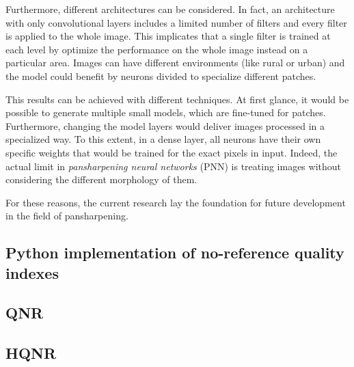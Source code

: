 \documentclass[12pt]{report}
\begin{document}
Furthermore, different architectures can be considered.
In fact, an architecture with only convolutional layers includes a limited number of filters and every filter is applied to the whole image.
This implicates that a single filter is trained at each level by optimize the performance on the whole image instead on a particular area.
Images can have different environments (like rural or urban) and the model could benefit by neurons divided to specialize different patches.

This results can be achieved with different techniques.
At first glance, it would be possible to generate multiple small models, which are fine-tuned for patches.
Furthermore, changing the model layers would deliver images processed in a specialized way.
To this extent, in a dense layer, all neurons have their own specific weights that would be trained for the exact pixels in input.
Indeed, the actual limit in \textit{pansharpening neural networks} (PNN) is treating images without considering the different morphology of them.

For these reasons, the current research lay the foundation for future development in the field of pansharpening.

\newpage




\newpage



\appendix

\begin{spacing}{1}
    \chapter{Python implementation of no-reference quality indexes }
        \section{QNR}
        \label{qnr_functions}
        

        \section{HQNR}
        \label{hqnr_functions}
        
\end{spacing}

\restoregeometry
\end{document}
